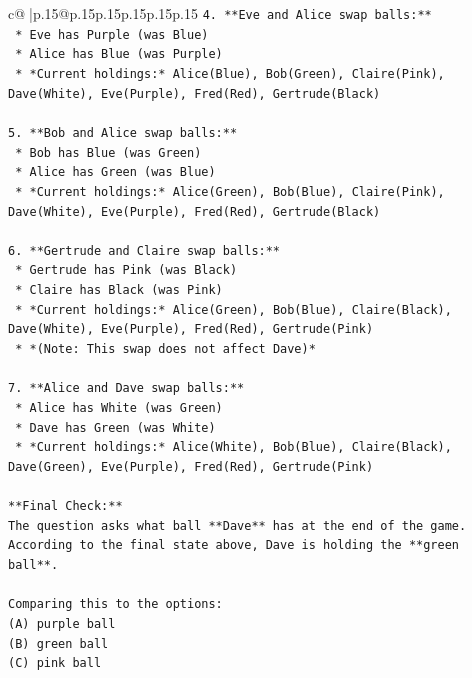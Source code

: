 \documentclass{article}
\begin{document}
{\begin{supertabular}{c@{$\;$}|p{.15\linewidth}@{}p{.15\linewidth}p{.15\linewidth}p{.15\linewidth}p{.15\linewidth}p{.15\linewidth}}
{{{\texttt{4.  **Eve and Alice swap balls:**} \\
\texttt{    *   Eve has Purple (was Blue)} \\
\texttt{    *   Alice has Blue (was Purple)} \\
\texttt{    *   *Current holdings:* Alice(Blue), Bob(Green), Claire(Pink), Dave(White), Eve(Purple), Fred(Red), Gertrude(Black)} \\
\\ 
\texttt{5.  **Bob and Alice swap balls:**} \\
\texttt{    *   Bob has Blue (was Green)} \\
\texttt{    *   Alice has Green (was Blue)} \\
\texttt{    *   *Current holdings:* Alice(Green), Bob(Blue), Claire(Pink), Dave(White), Eve(Purple), Fred(Red), Gertrude(Black)} \\
\\ 
\texttt{6.  **Gertrude and Claire swap balls:**} \\
\texttt{    *   Gertrude has Pink (was Black)} \\
\texttt{    *   Claire has Black (was Pink)} \\
\texttt{    *   *Current holdings:* Alice(Green), Bob(Blue), Claire(Black), Dave(White), Eve(Purple), Fred(Red), Gertrude(Pink)} \\
\texttt{    *   *(Note: This swap does not affect Dave)*} \\
\\ 
\texttt{7.  **Alice and Dave swap balls:**} \\
\texttt{    *   Alice has White (was Green)} \\
\texttt{    *   Dave has Green (was White)} \\
\texttt{    *   *Current holdings:* Alice(White), Bob(Blue), Claire(Black), Dave(Green), Eve(Purple), Fred(Red), Gertrude(Pink)} \\
\\ 
\texttt{**Final Check:**} \\
\texttt{The question asks what ball **Dave** has at the end of the game.} \\
\texttt{According to the final state above, Dave is holding the **green ball**.} \\
\\ 
\texttt{Comparing this to the options:} \\
\texttt{(A) purple ball} \\
\texttt{(B) green ball} \\
\texttt{(C) pink ball} \\
}}}
\end{supertabular}}
\end{document}
